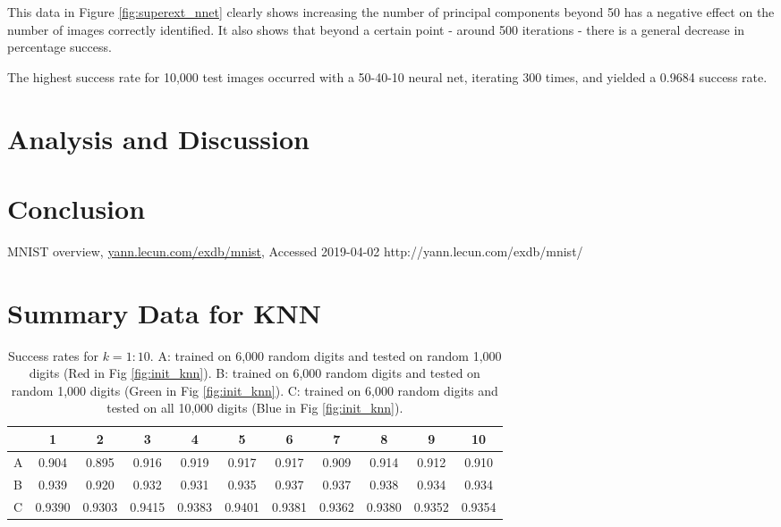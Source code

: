 \documentclass[11pt]{article} %
\begin{document}
This data in Figure \ref{fig:superext_nnet} clearly shows increasing the number of principal components beyond 50 has a negative effect on the number of images correctly identified. It also shows that beyond a certain point - around 500 iterations - there is a general decrease in percentage success. 

The highest success rate for 10,000 test images occurred with a 50-40-10 neural net, iterating 300 times, and yielded a 0.9684 success rate.


\section{Analysis and Discussion}



\section{Conclusion}

\newpage
\begin{thebibliography}{9}



 MNIST overview, \url{yann.lecun.com/exdb/mnist}, Accessed 2019-04-02
http://yann.lecun.com/exdb/mnist/
\end{thebibliography}

\newpage

\appendix
\label{appendix}
\section{Summary Data for KNN}
\label{sec:AppData}

\begin{table}[h]
\begin{center}
\begin{tabular}{l| c c c c c c c c c c}
 & 1 & 2 & 3 & 4 & 5 & 6 & 7 & 8 & 9 & 10\\
\hline
A & 0.904 & 0.895 & 0.916 & 0.919 & 0.917 & 0.917 & 0.909 & 0.914 & 0.912 & 0.910\\
B & 0.939 & 0.920 & 0.932 & 0.931 & 0.935 & 0.937 & 0.937 & 0.938 & 0.934 & 0.934\\
C & 0.9390 & 0.9303 & 0.9415 & 0.9383 & 0.9401 & 0.9381 & 0.9362 & 0.9380 & 0.9352 & 0.9354\\
\end{tabular}
\caption{Success rates for $k = 1:10$. A: trained on 6,000 random digits and tested on random 1,000 digits (Red in Fig \ref{fig:init_knn}). B: trained on 6,000 random digits and tested on random 1,000 digits (Green in Fig \ref{fig:init_knn}). C: trained on 6,000 random digits and tested on all 10,000 digits (Blue in Fig \ref{fig:init_knn}).}
\label{rand-10-all-test}
\end{center}
\end{table}
\end{document}
